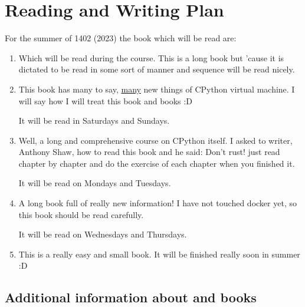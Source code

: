 		\clearpage
		\section{Reading and Writing Plan}
			\noindent For the summer of 1402 (2023) the book which will be read are:
			\begin{enumerate}
				\item {}
				
				Which will be read during the  course. This is a long book but 'cause it is dictated to be read in some sort of manner and sequence will be read nicely.
				
				\item {}
				
				This book has many to say, \underline{many} new things of CPython virtual machine. I will say how I will treat this book and  books :D
				
				It will be read in Saturdays and Sundays.
				
				\item {}
				
				Well, a long and comprehensive course on CPython itself. I asked to writer, Anthony Shaw, how to read this book and he said: Don't rust! just read chapter by chapter and do the exercise of each chapter when  you finished it.
				
				It will be read on Mondays and Tuesdays.
				
				\item {}
				
				A long book full of really new information! I have not touched docker yet, so this book should be read carefully.
				
				It will be read on Wednesdays and Thursdays.
				
				\item {}
				
				This is a really easy and small book. It will be finished really soon in summer :D
			\end{enumerate}
			
			\subsection{Additional information about  and  books}
